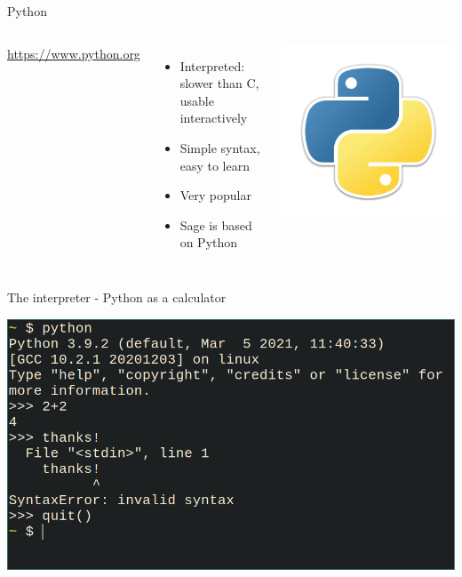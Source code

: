 \documentclass[11pt]{beamer}
\begin{document}
\begin{frame}{Python}
  \begin{columns}
      \url{https://www.python.org}

      \vspace{0.3cm}
      \begin{itemize}
        \item Interpreted: slower than C, usable interactively
        \item Simple syntax, easy to learn
        \item Very popular
        \item Sage is based on Python
      \end{itemize}
      \includegraphics[scale=0.16]{img/python.png}
  \end{columns}
\end{frame}

\begin{frame}{The interpreter - Python as a calculator}
  \begin{center}
    \includegraphics[scale=0.3]{img/term.png}
  \end{center}
\end{frame}
\end{document}
